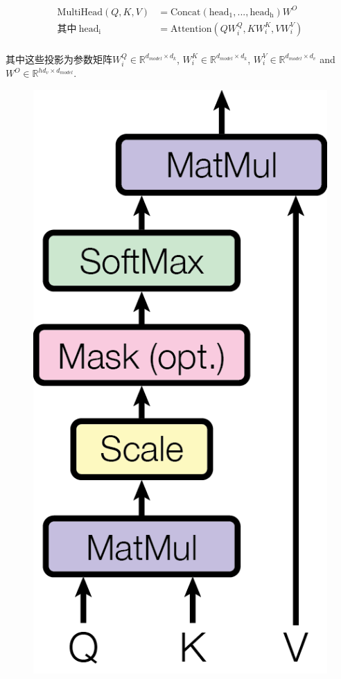 \begin{align}
  \mathrm{MultiHead}(Q, K, V)&= \mathrm{Concat}(\mathrm{head_1}, ..., \mathrm{head_h})W^O\\
  \text{其中}~\mathrm{head_i} &= \mathrm{Attention}(QW^Q_i, KW^K_i, VW^V_i)\\
\end{align}

其中这些投影为参数矩阵$W^Q_i \in \mathbb{R}^{d_{model} \times d_k}$, $W^K_i \in \mathbb{R}^{d_{model} \times d_k}$, $W^V_i \in \mathbb{R}^{d_{model} \times d_v}$ and $W^O \in \mathbb{R}^{hd_v \times d_{model}}$.
\begin{figure}[htbp]
  \centering
  \begin{minipage}[t]{0.4\textwidth}
    \centering
    \vspace{0.5cm}
    \includegraphics[scale=0.6]{figures/dotproductattention.png}

\end{minipage}
\end{figure}
